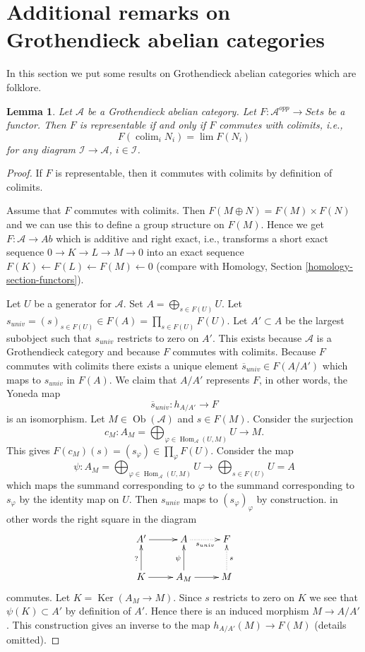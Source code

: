 \documentclass{stacks-project}
\theoremstyle{plain}
\newtheorem{lemma}[subsection]{Lemma}
\theoremstyle{definition}
\theoremstyle{remark}
\numberwithin{equation}{subsection}
\def\lim{\mathop{\mathrm{lim}}\nolimits}
\def\colim{\mathop{\mathrm{colim}}\nolimits}
\def\Hom{\mathop{\mathrm{Hom}}\nolimits}
\def\Ob{\mathop{\mathrm{Ob}}\nolimits}
\def\Ker{\mathop{\mathrm{Ker}}}
\begin{document}
\section{Additional remarks on Grothendieck abelian categories}
\label{section-additional-Grothendieck}

\noindent
In this section we put some results on Grothendieck abelian categories
which are folklore.

\begin{lemma}
\label{lemma-grothendieck-brown}
Let $\mathcal{A}$ be a Grothendieck abelian category.
Let $F : \mathcal{A}^{opp} \to \textit{Sets}$ be a functor.
Then $F$ is representable if and only if $F$ commutes with colimits, i.e.,
$$
F(\colim_i N_i) = \lim F(N_i)
$$
for any diagram $\mathcal{I} \to \mathcal{A}$, $i \in \mathcal{I}$.
\end{lemma}

\begin{proof}
If $F$ is representable, then it commutes with colimits by definition
of colimits.

\medskip\noindent
Assume that $F$ commutes with colimits. Then $F(M \oplus N) = F(M) \times F(N)$
and we can use this to define a group structure on $F(M)$. Hence we get
$F : \mathcal{A} \to \textit{Ab}$ which is additive and right exact, i.e.,
transforms a short exact sequence $0 \to K \to L \to M \to 0$ into an exact
sequence $F(K) \leftarrow F(L) \leftarrow F(M) \leftarrow 0$ (compare with
Homology, Section \ref{homology-section-functors}).

\medskip\noindent
Let $U$ be a generator for $\mathcal{A}$. Set $A = \bigoplus_{s \in F(U)} U$.
Let $s_{univ} = (s)_{s \in F(U)} \in F(A) = \prod_{s \in F(U)} F(U)$. Let
$A' \subset A$ be the largest subobject such that $s_{univ}$ restricts to
zero on $A'$. This exists because $\mathcal{A}$ is a Grothendieck category
and because $F$ commutes with colimits. Because $F$ commutes with colimits
there exists a unique element $\overline{s}_{univ} \in F(A/A')$ which
maps to $s_{univ}$ in $F(A)$. We claim that $A/A'$ represents $F$, in
other words, the Yoneda map
$$
\overline{s}_{univ} : h_{A/A'} \longrightarrow F
$$
is an isomorphism. Let $M \in \Ob(\mathcal{A})$ and $s \in F(M)$. Consider
the surjection
$$
c_M :
A_M = \bigoplus\nolimits_{\varphi \in \Hom_\mathcal{A}(U, M)} U
\longrightarrow
M.
$$
This gives $F(c_M)(s) = (s_\varphi) \in \prod_\varphi F(U)$.
Consider the map
$$
\psi :
A_M = \bigoplus\nolimits_{\varphi \in \Hom_\mathcal{A}(U, M)} U
\longrightarrow
\bigoplus\nolimits_{s \in F(U)} U = A
$$
which maps the summand corresponding to $\varphi$ to the summand
corresponding to $s_\varphi$ by the identity map on $U$. Then $s_{univ}$
maps to $(s_\varphi)_\varphi$ by construction.
in other words the right square in the diagram
$$
\xymatrix{
A' \ar[r] &
A \ar@{..>}[r]_{s_{univ}} & F \\
K \ar[r] \ar[u]^{?} & A_M \ar[u]^\psi \ar[r] &
M \ar@{..>}[u]_s
}
$$
commutes. Let $K = \Ker(A_M \to M)$. Since $s$ restricts to zero
on $K$ we see that $\psi(K) \subset A'$ by definition of $A'$. Hence there
is an induced morphism $M \to A/A'$. This construction gives an inverse
to the map $h_{A/A'}(M) \to F(M)$ (details omitted).
\end{proof}
\end{document}
